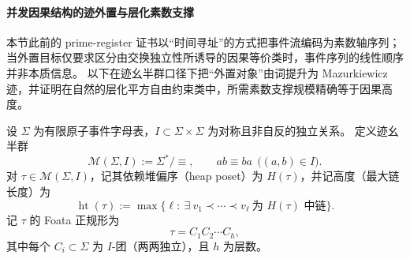 \paragraph{并发因果结构的迹外置与层化素数支撑}\label{par:conclusion-trace-externalization-foata-godel}
本节此前的 prime-register 证书以“时间寻址”的方式把事件流编码为素数轴序列；当外置目标仅要求区分由交换独立性所诱导的因果等价类时，事件序列的线性顺序并非本质信息。
以下在迹幺半群口径下把“外置对象”由词提升为 Mazurkiewicz 迹，并证明在自然的层化平方自由约束类中，所需素数支撑规模精确等于因果高度。

设 \(\Sigma\) 为有限原子事件字母表，\(I\subset\Sigma\times\Sigma\) 为对称且非自反的独立关系。
定义迹幺半群
\[
\mathcal M(\Sigma,I):=\Sigma^\ast/{\equiv},
\qquad
ab\equiv ba\ \ \bigl((a,b)\in I\bigr).
\]
对 \(\tau\in\mathcal M(\Sigma,I)\)，记其依赖堆偏序（heap poset）为 \(H(\tau)\)，并记高度（最大链长度）为
\[
\operatorname{ht}(\tau):=\max\{\ell:\ \exists\ v_1\prec\cdots\prec v_\ell\ \text{为 }H(\tau)\text{ 中链}\}.
\]
记 \(\tau\) 的 Foata 正规形为
\[
\tau=C_1C_2\cdots C_h,
\]
其中每个 \(C_i\subset\Sigma\) 为 \(I\)-团（两两独立），且 \(h\) 为层数。

